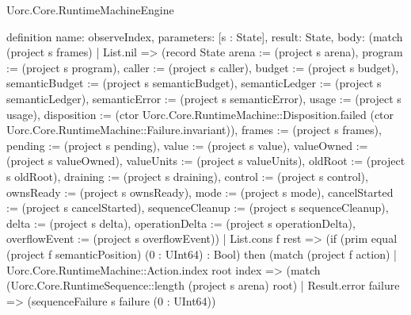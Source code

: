 \begin{lexlean}{Uorc.Core.RuntimeMachineEngine}
\begin{semanticmodule}
definition{
  name: observeIndex,
  parameters: [s : State],
  result: State,
  body: (match (project s frames)
    | List.nil => (record State {arena := (project s arena), program := (project s program), caller := (project s caller), budget := (project s budget), semanticBudget := (project s semanticBudget), semanticLedger := (project s semanticLedger), semanticError := (project s semanticError), usage := (project s usage), disposition := (ctor Uorc.Core.RuntimeMachine::Disposition.failed (ctor Uorc.Core.RuntimeMachine::Failure.invariant)), frames := (project s frames), pending := (project s pending), value := (project s value), valueOwned := (project s valueOwned), valueUnits := (project s valueUnits), oldRoot := (project s oldRoot), draining := (project s draining), control := (project s control), ownsReady := (project s ownsReady), mode := (project s mode), cancelStarted := (project s cancelStarted), sequenceCleanup := (project s sequenceCleanup), delta := (project s delta), operationDelta := (project s operationDelta), overflowEvent := (project s overflowEvent)})
    | List.cons f rest => (if (prim equal (project f semanticPosition) (0 : UInt64) : Bool) then (match (project f action)
      | Uorc.Core.RuntimeMachine::Action.index root index => (match (Uorc.Core.RuntimeSequence::length (project s arena) root)
        | Result.error failure => (sequenceFailure s failure (0 : UInt64))
}
\end{semanticmodule}
\end{lexlean}
